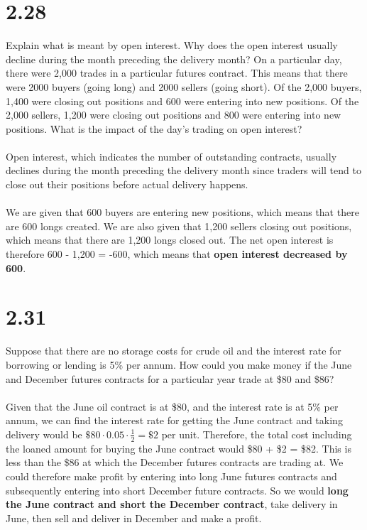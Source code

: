 \documentclass{article}
\begin{document}
{\Large 

\section*{2.28}

Explain what is meant by open interest. Why does the open interest usually decline during the month preceding the delivery month? On a particular day, there were 2,000 trades in a particular futures contract. This means that there were 2000 buyers (going long) and 2000 sellers (going short). Of the 2,000 buyers, 1,400 were closing out positions and 600 were entering into new positions. Of the 2,000 sellers, 1,200 were closing out positions and 800 were entering into new positions. What is the impact of the day's trading on open interest? \\ \\
Open interest, which indicates the number of outstanding contracts, usually declines during the month preceding the delivery month since traders will tend to close out their positions before actual delivery happens. \\ \\
We are given that 600 buyers are entering new positions, which means that there are 600 longs created. We are also given that 1,200 sellers closing out positions, which means that there are 1,200 longs closed out. The net open interest is therefore 600 - 1,200 = -600, which means that \textbf{open interest decreased by 600}.

}
{\Large 

\section*{2.31}

Suppose that there are no storage costs for crude oil and the interest rate for borrowing or lending is 5\% per annum. How could you make money if the June and December futures contracts for a particular year trade at \$80 and \$86? \\ \\
Given that the June oil contract is at \$80, and the interest rate is at 5\% per annum, we can find the interest rate for getting the June contract and taking delivery would be \(\$80 \cdot 0.05 \cdot \frac{1}{2} = \$2\) per unit. Therefore, the total cost including the loaned amount for buying the June contract would \$80 + \$2 = \$82. This is less than the \$86 at which the December futures contracts are trading at. We could therefore make profit by entering into long June futures contracts and subsequently entering into short December future contracts. So we would \textbf{long the June contract and short the December contract}, take delivery in June, then sell and deliver in December and make a profit. 

}
\end{document}
